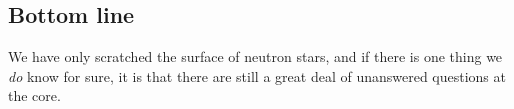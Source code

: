\subsection*{Bottom line}

We have only scratched the surface of neutron stars, and if there is one thing we \emph{do} know for sure, it is that there are still a great deal of unanswered questions at the core.
